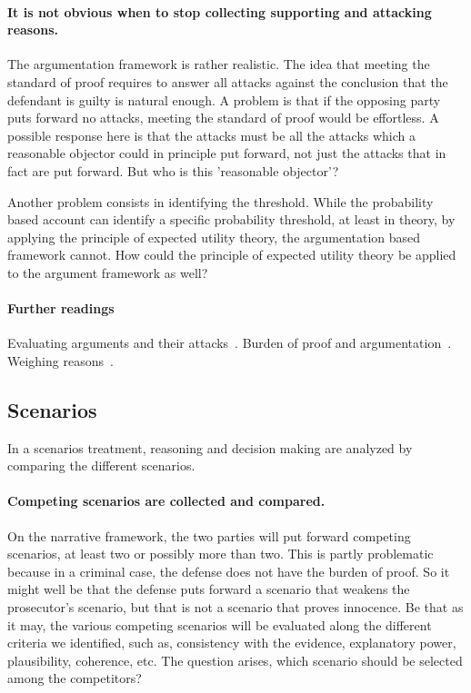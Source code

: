 \documentclass[10pt]{article}
\begin{document}
\paragraph{It is not obvious when to stop collecting supporting and attacking reasons.}


The argumentation framework is rather realistic. The idea that meeting the standard of proof requires to answer all 
attacks against the conclusion that the defendant is guilty 
is natural enough. A problem is that if the opposing party puts forward no attacks, meeting the standard of proof would be effortless. 
A possible response here is that the attacks must be all the attacks which a reasonable objector could in principle put forward, not just 
the attacks that in fact are put forward. %
But who is this 'reasonable objector'?

Another problem consists in identifying the threshold. While the probability based account can identify a specific probability threshold, 
at least in theory, by applying the principle of expected utility theory, the argumentation based framework cannot. 
How could the principle of expected utility theory be applied to the argument framework as well?



\paragraph{Further readings}
Evaluating arguments and their attacks~\citep{pollock1995,dung1995}. Burden of proof and argumentation~\citep{gordonEtal2007,gordon2009,prakkenSartor2007, prakken2009}. Weighing reasons~\citep{hage1997}.



\subsection{Scenarios}

In a scenarios treatment, reasoning and decision making are analyzed by comparing the different scenarios.

\paragraph{Competing scenarios are collected and compared.}

On the narrative framework, the two parties will put forward competing scenarios, at least two or possibly more than two. This is partly problematic because in a criminal case, the defense does not have the burden of proof. So it might well be that the defense puts forward a scenario that weakens the prosecutor's scenario, but that is not 
a scenario that proves innocence. Be that as it may, the various competing scenarios will be evaluated along the different criteria we identified, such as, consistency with the evidence, explanatory power, plausibility, coherence, etc. The question arises, which scenario should be selected among the competitors?
\end{document}

